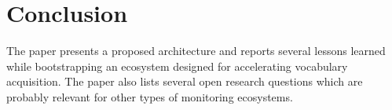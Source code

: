 
\section{Conclusion}

The paper presents a proposed architecture and reports
several lessons learned while bootstrapping an ecosystem designed for accelerating vocabulary acquisition.
The paper also lists several open research questions which are probably relevant for other types of monitoring ecosystems. 

